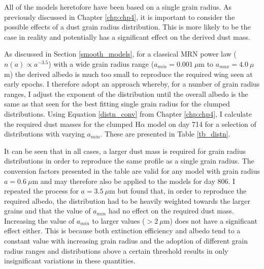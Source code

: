 All of the models heretofore have been based on a single grain radius.  As previously discussed in Chapter \ref{chp:chp4}, it is important to consider the possible effects of a dust grain radius distribution.  This is more likely to be the case in reality and potentially has a significant effect on the derived dust mass.  

 As discussed in Section \ref{smooth_models}, for a classical MRN power law ($n(a) \propto a^{-3.5}$) with a wide grain radius range ($a_{min} = 0.001~\mu$m to $a_{max} = 4.0~\mu$m) the derived albedo is much too small to reproduce the required wing seen at early epochs.  I therefore adopt an approach whereby, for a number of grain radius ranges, I adjust the exponent of the distribution until the overall albedo is the same as that seen for the best fitting single grain radius for the clumped distributions. Using Equation \ref{distn_conv} from Chapter \ref{chp:chp4}, I calculate the required dust masses for the clumped H$\alpha$ model on day 714 for a selection of distributions with varying $a_{min}$.  These are presented in Table \ref{tb_distn}.  
 
 It can be seen that in all cases, a larger dust mass is required for grain radius distributions in order to reproduce the same profile as a single grain radius.  The conversion factors presented in the table are valid for any model with grain radius $a=0.6~\mu$m and may therefore also be applied to the models for day 806.  I repeated the process for $a=3.5~\mu$m but found that, in order to reproduce the required albedo, the distribution had to be heavily weighted towards the larger grains and that the value of $a_{min}$ had no effect on the required dust mass.  Increasing the value of $a_{min}$ to larger values ($>2~\mu$m) does not have a significant effect either.  This is because both extinction efficiency and albedo tend to a constant value with increasing grain radius and the adoption of different grain radius ranges and distributions above a certain threshold results in only insignificant variations in these quantities.
 
